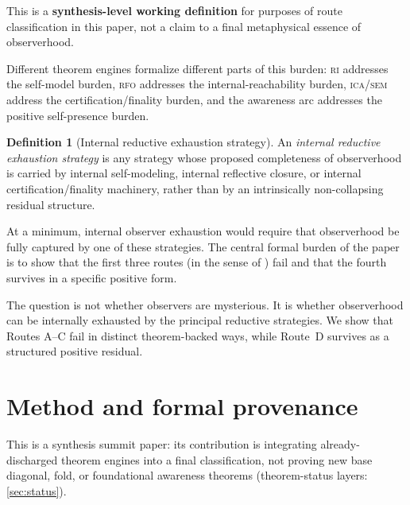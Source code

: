 \documentclass[11pt]{article}
\theoremstyle{plain}
\theoremstyle{definition}
\newtheorem{definition}[theorem]{Definition}
\theoremstyle{remark}
\newcommand{\RI}{\textsc{ri}}
\newcommand{\RFO}{\textsc{rfo}}
\newcommand{\ICA}{\textsc{ica}}
\newcommand{\SEM}{\textsc{sem}}
\begin{document}
This is a \textbf{synthesis-level working definition} for purposes of route
classification in this paper, not a claim to a final metaphysical essence
of observerhood.

Different theorem engines formalize different parts of this burden:
\RI{} addresses the self-model burden, \RFO{} addresses the
internal-reachability burden, \ICA/\SEM{} address the
certification/finality burden, and the awareness arc addresses the
positive self-presence burden.

\begin{definition}[Internal reductive exhaustion strategy]
\label{def:strategy}
An \emph{internal reductive exhaustion strategy} is any strategy whose
proposed completeness of observerhood is carried by internal
self-modeling, internal reflective closure, or internal
certification/finality machinery, rather than by an intrinsically
non-collapsing residual structure.
\end{definition}

At a minimum, internal observer exhaustion would require that
observerhood be fully captured by one of these strategies.  The central
formal burden of the paper is to show that the first three routes (in the
sense of ) fail and that the fourth survives in a
specific positive form.

\begin{keybox}[title={Classification target}]
The question is not whether observers are mysterious.  It is whether
observerhood can be internally exhausted by the principal reductive
strategies.  We show that Routes A--C fail in distinct theorem-backed
ways, while Route~D survives as a structured positive residual.
\end{keybox}

\section{Method and formal provenance}
\label{sec:method}

This is a synthesis summit paper: its contribution is integrating
already-discharged theorem engines into a final classification, not
proving new base diagonal, fold, or foundational awareness theorems
(theorem-status layers: \cref{sec:status}).
\end{document}
